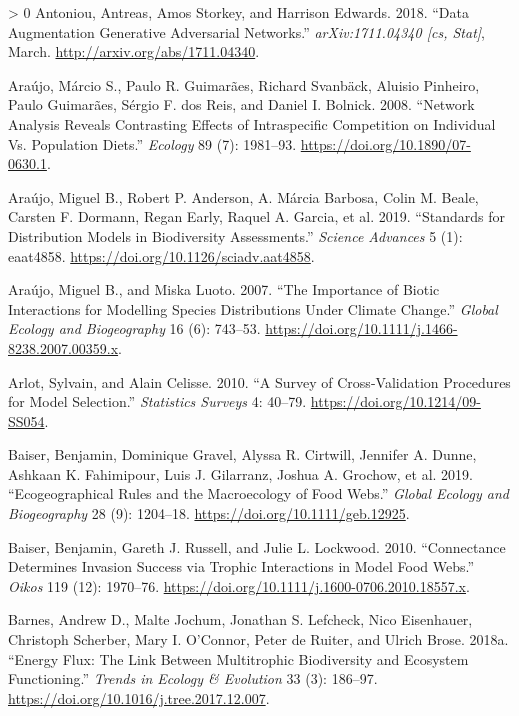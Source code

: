 \documentclass[10pt,oneside]{article}
\newlength{\cslhangindent}
\newenvironment{CSLReferences}[3] %
 {%
  \setlength{\parindent}{0pt}
  \ifodd #1 \everypar{\setlength{\hangindent}{\cslhangindent}}\ignorespaces\fi
  \ifnum #2 > 0
  \setlength{\parskip}{#2\baselineskip}
  \fi
 }%
 {}
\begin{document}
\begin{CSLReferences}{1}{0}
\leavevmode\hypertarget{ref-Antoniou2018DatAug}{}%
Antoniou, Antreas, Amos Storkey, and Harrison Edwards. 2018. {``Data
Augmentation Generative Adversarial Networks.''} \emph{arXiv:1711.04340
{[}cs, Stat{]}}, March. \url{http://arxiv.org/abs/1711.04340}.

\leavevmode\hypertarget{ref-Araujo2008NetAna}{}%
Araújo, Márcio S., Paulo R. Guimarães, Richard Svanbäck, Aluisio
Pinheiro, Paulo Guimarães, Sérgio F. dos Reis, and Daniel I. Bolnick.
2008. {``Network Analysis Reveals Contrasting Effects of Intraspecific
Competition on Individual Vs. Population Diets.''} \emph{Ecology} 89
(7): 1981--93. \url{https://doi.org/10.1890/07-0630.1}.

\leavevmode\hypertarget{ref-Araujo2019StaDis}{}%
Araújo, Miguel B., Robert P. Anderson, A. Márcia Barbosa, Colin M.
Beale, Carsten F. Dormann, Regan Early, Raquel A. Garcia, et al. 2019.
{``Standards for Distribution Models in Biodiversity Assessments.''}
\emph{Science Advances} 5 (1): eaat4858.
\url{https://doi.org/10.1126/sciadv.aat4858}.

\leavevmode\hypertarget{ref-Araujo2007ImpBio}{}%
Araújo, Miguel B., and Miska Luoto. 2007. {``The Importance of Biotic
Interactions for Modelling Species Distributions Under Climate
Change.''} \emph{Global Ecology and Biogeography} 16 (6): 743--53.
\url{https://doi.org/10.1111/j.1466-8238.2007.00359.x}.

\leavevmode\hypertarget{ref-Arlot2010SurCro}{}%
Arlot, Sylvain, and Alain Celisse. 2010. {``A Survey of Cross-Validation
Procedures for Model Selection.''} \emph{Statistics Surveys} 4: 40--79.
\url{https://doi.org/10.1214/09-SS054}.

\leavevmode\hypertarget{ref-Baiser2019EcoRul}{}%
Baiser, Benjamin, Dominique Gravel, Alyssa R. Cirtwill, Jennifer A.
Dunne, Ashkaan K. Fahimipour, Luis J. Gilarranz, Joshua A. Grochow, et
al. 2019. {``Ecogeographical Rules and the Macroecology of Food Webs.''}
\emph{Global Ecology and Biogeography} 28 (9): 1204--18.
\url{https://doi.org/10.1111/geb.12925}.

\leavevmode\hypertarget{ref-Baiser2010ConDet}{}%
Baiser, Benjamin, Gareth J. Russell, and Julie L. Lockwood. 2010.
{``Connectance Determines Invasion Success via Trophic Interactions in
Model Food Webs.''} \emph{Oikos} 119 (12): 1970--76.
\url{https://doi.org/10.1111/j.1600-0706.2010.18557.x}.

\leavevmode\hypertarget{ref-Barnes2018EneFlu}{}%
Barnes, Andrew D., Malte Jochum, Jonathan S. Lefcheck, Nico Eisenhauer,
Christoph Scherber, Mary I. O'Connor, Peter de Ruiter, and Ulrich Brose.
2018a. {``Energy Flux: The Link Between Multitrophic Biodiversity and
Ecosystem Functioning.''} \emph{Trends in Ecology \& Evolution} 33 (3):
186--97. \url{https://doi.org/10.1016/j.tree.2017.12.007}.


\end{CSLReferences}
\end{document}
